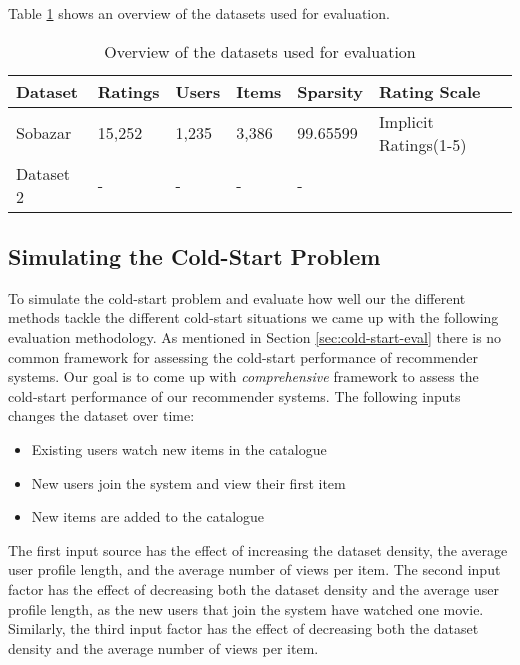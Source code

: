 Table \ref{table:datasets} shows an overview of the datasets used for evaluation.


\begin{table}[H]
    \centering
    \begin{tabular}{|l|l|l|l|l|l|}
    \hline
	Dataset			& 	Ratings 	& 	Users	& 	Items 	& 	Sparsity	& Rating Scale 				\\ \hline
	Sobazar 		& 	15,252  	& 	1,235	&	3,386	&	99.65599	& Implicit Ratings(1-5)		\\ \hline
	Dataset 2 		& 	-  			& 	-		&	-		&	-			&							\\ \hline
    \end{tabular}
    \label{table:datasets}
    \caption [Overview of the datasets used for evaluation]{Overview of the datasets used for evaluation}
\end{table}


\subsection{Simulating the Cold-Start Problem}

To simulate the cold-start problem and evaluate how well our the different
methods tackle the different cold-start situations we came up with the following
evaluation methodology. As mentioned in Section \ref{sec:cold-start-eval} there is
no common framework for assessing the cold-start performance of recommender systems.
Our goal is to come up with \emph{comprehensive} framework to assess the cold-start
performance of our recommender systems. The following inputs changes the dataset over time:

\begin{itemize}
	\item 	Existing users watch new items in the catalogue
	\item	New users join the system and view their first item
	\item	New items are added to the catalogue
\end{itemize}

The first input source has the effect of increasing the dataset density, the average user
profile length, and the average number of views per item. The second input factor has
the effect of decreasing both the dataset density and the average user profile length,
as the new users that join the system have watched one movie. Similarly, the third input
factor has the effect of decreasing both the dataset density and the average number of
views per item.

